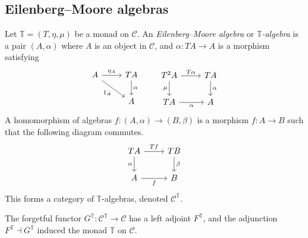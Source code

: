 \subsection{Eilenberg--Moore algebras}
\begin{definition}
    Let \( \mathbb T = (T, \eta, \mu) \) be a monad on \( \mathcal C \).
    An \emph{Eilenberg--Moore algebra} or \emph{\( \mathbb T \)-algebra} is a pair \( (A, \alpha) \) where \( A \) is an object in \( \mathcal C \), and \( \alpha : TA \to A \) is a morphism satisfying
\[\begin{tikzcd}
	A & TA \\
	& A
	\arrow["{\eta_A}", from=1-1, to=1-2]
	\arrow["\alpha", from=1-2, to=2-2]
	\arrow["{1_A}"', from=1-1, to=2-2]
\end{tikzcd}\quad\quad\begin{tikzcd}
	T^2A & TA \\
	TA & A
	\arrow["T\alpha", from=1-1, to=1-2]
	\arrow["\alpha", from=1-2, to=2-2]
	\arrow["\mu"', from=1-1, to=2-1]
	\arrow["\alpha"', from=2-1, to=2-2]
\end{tikzcd}\]
    A homomorphism of algebras \( f : (A, \alpha) \to (B, \beta) \) is a morphism \( f : A \to B \) such that the following diagram commutes.
\[\begin{tikzcd}
	TA & TB \\
	A & B
	\arrow["Tf", from=1-1, to=1-2]
	\arrow["\beta", from=1-2, to=2-2]
	\arrow["\alpha"', from=1-1, to=2-1]
	\arrow["f"', from=2-1, to=2-2]
\end{tikzcd}\]
    This forms a category of \( \mathbb T \)-algebras, denoted \( \mathcal C^{\mathbb T} \).
\end{definition}
\begin{proposition}
    The forgetful functor \( G^{\mathbb T} : \mathcal C^{\mathbb T} \to \mathcal C \) has a left adjoint \( F^{\mathbb T} \), and the adjunction \( F^{\mathbb T} \dashv G^{\mathbb T} \) induced the monad \( \mathbb T \) on \( \mathcal C \).
\end{proposition}
